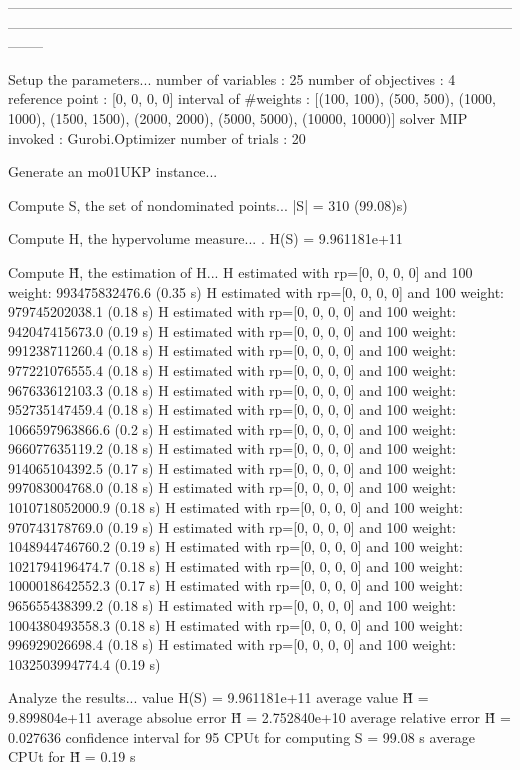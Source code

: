 --------------------------------------------------------------------------------------------------------------------------------------------------------------------------------------------------------------------------------

Setup the parameters...
  number of variables  : 25
  number of objectives : 4
  reference point      : [0, 0, 0, 0]
  interval of #weights : [(100, 100), (500, 500), (1000, 1000), (1500, 1500), (2000, 2000), (5000, 5000), (10000, 10000)]
  solver MIP invoked   : Gurobi.Optimizer
  number of trials     : 20

Generate an mo01UKP instance...

Compute S, the set of nondominated points...
  |S|  = 310 (99.08)s)

Compute H, the hypervolume measure...
. H(S) = 9.961181e+11

Compute H̃, the estimation of H...
  H estimated with rp=[0, 0, 0, 0] and 100 weight:  993475832476.6  (0.35 s)
  H estimated with rp=[0, 0, 0, 0] and 100 weight:  979745202038.1  (0.18 s)
  H estimated with rp=[0, 0, 0, 0] and 100 weight:  942047415673.0  (0.19 s)
  H estimated with rp=[0, 0, 0, 0] and 100 weight:  991238711260.4  (0.18 s)
  H estimated with rp=[0, 0, 0, 0] and 100 weight:  977221076555.4  (0.18 s)
  H estimated with rp=[0, 0, 0, 0] and 100 weight:  967633612103.3  (0.18 s)
  H estimated with rp=[0, 0, 0, 0] and 100 weight:  952735147459.4  (0.18 s)
  H estimated with rp=[0, 0, 0, 0] and 100 weight:  1066597963866.6  (0.2 s)
  H estimated with rp=[0, 0, 0, 0] and 100 weight:  966077635119.2  (0.18 s)
  H estimated with rp=[0, 0, 0, 0] and 100 weight:  914065104392.5  (0.17 s)
  H estimated with rp=[0, 0, 0, 0] and 100 weight:  997083004768.0  (0.18 s)
  H estimated with rp=[0, 0, 0, 0] and 100 weight:  1010718052000.9  (0.18 s)
  H estimated with rp=[0, 0, 0, 0] and 100 weight:  970743178769.0  (0.19 s)
  H estimated with rp=[0, 0, 0, 0] and 100 weight:  1048944746760.2  (0.19 s)
  H estimated with rp=[0, 0, 0, 0] and 100 weight:  1021794196474.7  (0.18 s)
  H estimated with rp=[0, 0, 0, 0] and 100 weight:  1000018642552.3  (0.17 s)
  H estimated with rp=[0, 0, 0, 0] and 100 weight:  965655438399.2  (0.18 s)
  H estimated with rp=[0, 0, 0, 0] and 100 weight:  1004380493558.3  (0.18 s)
  H estimated with rp=[0, 0, 0, 0] and 100 weight:  996929026698.4  (0.18 s)
  H estimated with rp=[0, 0, 0, 0] and 100 weight:  1032503994774.4  (0.19 s)

Analyze the results...
  value H(S)                  = 9.961181e+11 
  average value H̃             = 9.899804e+11 
  average absolue error H̃     = 2.752840e+10 
  average relative error H̃    = 0.027636 
  confidence interval for 95%
  CPUt for computing S         = 99.08 s
  average CPUt for H̃           = 0.19 s

